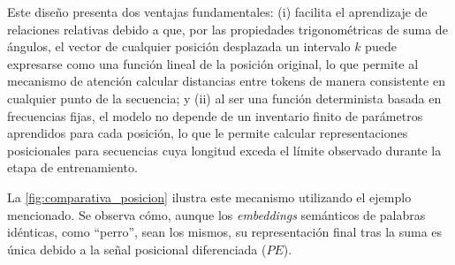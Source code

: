 \documentclass[12pt,a4paper]{report}
\begin{document}
Este diseño presenta dos ventajas fundamentales: (i) facilita el aprendizaje de relaciones relativas debido a que, por las propiedades trigonométricas de suma de ángulos, el vector de cualquier posición desplazada un intervalo $k$ puede expresarse como una función lineal de la posición original, lo que permite al mecanismo de atención calcular distancias entre tokens de manera consistente en cualquier punto de la secuencia; y (ii) al ser una función determinista basada en frecuencias fijas, el modelo no depende de un inventario finito de parámetros aprendidos para cada posición, lo que le permite calcular representaciones posicionales para secuencias cuya longitud exceda el límite observado durante la etapa de entrenamiento.

La \autoref{fig:comparativa_posicion} ilustra este mecanismo utilizando el ejemplo mencionado. Se observa cómo, aunque los \textit{embeddings} semánticos de palabras idénticas, como ``perro'', sean los mismos, su representación final tras la suma es única debido a la señal posicional diferenciada ($PE$).
\end{document}
